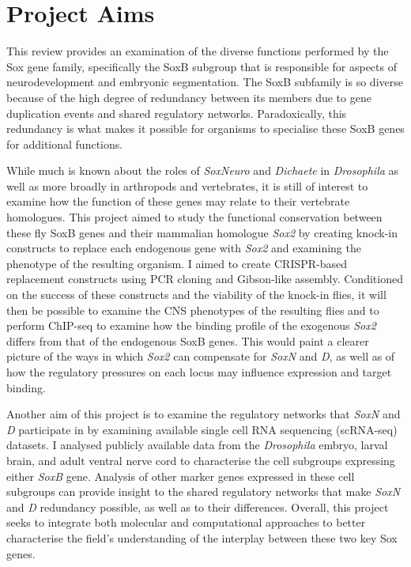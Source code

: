 \documentclass[withindex,glossary]{cam-thesis}
\begin{document}
\section{Project Aims}

This review provides an examination of the diverse functions performed
by the Sox gene family, specifically the SoxB subgroup that is
responsible for aspects of neurodevelopment and embryonic segmentation.
The SoxB subfamily is so diverse because of the high degree of
redundancy between its members due to gene duplication events and shared
regulatory networks. Paradoxically, this redundancy is what makes it
possible for organisms to specialise these SoxB genes for additional
functions.

While much is known about the roles of \emph{SoxNeuro} and
\emph{Dichaete} in \emph{Drosophila} as well as more broadly in
arthropods and vertebrates, it is still of interest to examine how the
function of these genes may relate to their vertebrate homologues. This
project aimed to study the functional conservation between these fly
SoxB genes and their mammalian homologue \emph{Sox2} by creating
knock-in constructs to replace each endogenous gene with \emph{Sox2} and
examining the phenotype of the resulting organism. I aimed to create
CRISPR-based replacement constructs using PCR cloning and Gibson-like
assembly. Conditioned on the success of these constructs and the
viability of the knock-in flies, it will then be possible to examine the
CNS phenotypes of the resulting flies and to perform \gls{ChIP-seq} to examine
how the binding profile of the exogenous \emph{Sox2} differs from that
of the endogenous SoxB genes. This would paint a clearer picture of the
ways in which \emph{Sox2} can compensate for \emph{SoxN} and \emph{D},
as well as of how the regulatory pressures on each locus may influence
expression and target binding.

Another aim of this project is to examine the regulatory networks that
\emph{SoxN} and \emph{D} participate in by examining available single
cell RNA sequencing (\gls{scRNA-seq}) datasets. I analysed publicly available
data from the \emph{Drosophila} embryo, larval brain, and adult ventral
nerve cord to characterise the cell subgroups expressing either
\emph{SoxB} gene. Analysis of other marker genes expressed in these cell
subgroups can provide insight to the shared regulatory networks that
make \emph{SoxN} and \emph{D} redundancy possible, as well as to their
differences. Overall, this project seeks to integrate both molecular and
computational approaches to better characterise the field's
understanding of the interplay between these two key Sox genes.
\end{document}
